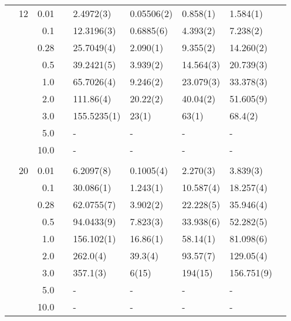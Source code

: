 \begin{table}[H]
\begin{tabularx}{\textwidth}{R{1cm}rrcR{2.3cm}R{2.3cm}R{2.3cm}R{2.3cm}R{1cm}}
		&12 & 0.01 && 2.4972(3) & 0.05506(2) & 0.858(1) & 1.584(1)\\
		&& 0.1 && 12.3196(3) & 0.6885(6) & 4.393(2) & 7.238(2) \\
		&& 0.28 && 25.7049(4) & 2.090(1) & 9.355(2) & 14.260(2) \\
		&& 0.5 && 39.2421(5) & 3.939(2) & 14.564(3) & 20.739(3) \\
		&& 1.0 && 65.7026(4) & 9.246(2) & 23.079(3) & 33.378(3) \\
		&& 2.0 && 111.86(4) & 20.22(2) & 40.04(2) & 51.605(9) \\
		&& 3.0 && 155.5235(1) & 23(1) & 63(1) & 68.4(2) \\ 
		&& 5.0 && - & - & - & -\\
		&& 10.0 && - & - & - & -\\
		\hdashline \\
		
		&20 & 0.01 && 6.2097(8) & 0.1005(4) & 2.270(3) & 3.839(3) \\
		&& 0.1 && 30.086(1) & 1.243(1) & 10.587(4) & 18.257(4) \\
		&& 0.28 && 62.0755(7) & 3.902(2) & 22.228(5) & 35.946(4) \\
		&& 0.5 && 94.0433(9) & 7.823(3) & 33.938(6) & 52.282(5) \\
		&& 1.0 && 156.102(1) & 16.86(1) & 58.14(1) & 81.098(6) \\
		&& 2.0 && 262.0(4) & 39.3(4) & 93.57(7) & 129.05(4) \\
		&& 3.0 && 357.1(3) & 6(15) & 194(15) & 156.751(9) \\ 
		&& 5.0 && - & - & - & -\\
		&& 10.0 && - & - & - & -\\
		\hline \hline
	\end{tabularx}
\end{table} 

